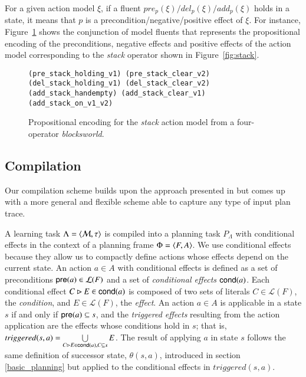 For a given action model $\xi$, if a fluent $pre_p(\xi)/del_p(\xi)/add_p(\xi)$ holds in a state, it means that $p$ is a precondition/negative/positive effect of $\xi$. For instance, Figure~\ref{fig:encodedstack} shows the conjunction of model fluents that represents the propositional encoding of the preconditions, negative effects and positive effects of the action model corresponding to the {\em stack} operator shown in Figure~\ref{fig:stack}.

\begin{figure}[hbt!]
\begin{footnotesize}
\begin{verbatim}
(pre_stack_holding_v1) (pre_stack_clear_v2)
(del_stack_holding_v1) (del_stack_clear_v2)
(add_stack_handempty) (add_stack_clear_v1) (add_stack_on_v1_v2)
\end{verbatim}
\end{footnotesize}
 \caption{\small Propositional encoding for the {\em stack} action model from a four-operator {\em blocksworld}.}
\label{fig:encodedstack}
\end{figure}


\subsection{Compilation}
\label{compilation}

Our compilation scheme builds upon the approach presented in \cite{aineto2018learning} but \FAMA comes up with a more general and flexible scheme able to capture any type of input plan trace.

\vspace{0.1cm}

A learning task $\Lambda={\langle \mathcal{M},\tau \rangle}$ is compiled into a planning task $P_{\Lambda}$ with conditional effects in the context of a planning frame $\Phi={\langle F,A \rangle}$. We use conditional effects because they allow us to compactly define actions whose effects depend on the current state. An action $a\in A$ with conditional effects is defined as a set of preconditions $\mathsf{pre}(a)\in\mathcal{L}(F)$ and a set of {\em conditional effects} $\mathsf{cond}(a)$. Each conditional effect $C\rhd E\in\mathsf{cond}(a)$ is composed of two sets of literals $C\in\mathcal{L}(F)$, the {\em condition}, and $E\in\mathcal{L}(F)$, the {\em effect}. An action $a\in A$ is applicable in a state $s$ if and only if $\mathsf{pre}(a)\subseteq s$, and the {\em triggered effects} resulting from the action application are the effects whose conditions hold in $s$; that is, $triggered(s,a)=\bigcup\limits_{C\rhd E\in\mathsf{cond}(a),C\subseteq s} E$. The result of applying $a$ in state $s$ follows the same definition of successor state, $\theta(s,a)$, introduced in section \ref{basic_planning} but applied to the conditional effects in $triggered(s,a)$.


